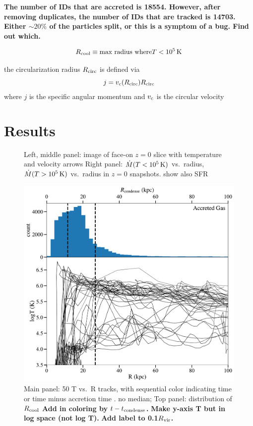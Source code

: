 \documentclass[fleqn,usenatbib]{mnras}
\newcommand{\Rcool}{R_{\rm cool}} %
\newcommand{\Mdot}{\dot{M}}
\newcommand{\Rcirc}{R_{\rm circ}} %
\begin{document}
\textbf{The number of IDs that are accreted is 18554.
However, after removing duplicates, the number of IDs that are tracked is 14703.
Either $\sim20\%$ of the particles split, or this is a symptom of a bug.
Find out which.}


\begin{equation}
    \Rcool \equiv \text{max radius where} T<10^5\,{\rm K}
\end{equation}


the circularization radius $\Rcirc$ is defined via
\begin{equation}
    j = v_{\rm c}(\Rcirc)\Rcirc
\end{equation}
where $j$ is the specific angular momentum and $v_{\rm c}$ is the circular velocity



\section{Results}


\begin{figure}
    \centering
    \caption{
    Left, middle panel: image of face-on $z=0$ slice with temperature and velocity arrows
    Right panel: $\Mdot(T<10^{5}\,{\rm K})$ vs.\ radius, $\Mdot(T>10^{5}\,{\rm K})$ vs.\ radius in $z=0$ snapshots. show also SFR}
    \label{f:Mdot}
\end{figure}


\begin{figure}
    \centering
    \includegraphics[width=\columnwidth]{figures/rcondense_and_tracks.pdf}
    \caption{
    Main panel: 50 T vs.\ R tracks, with sequential color indicating time or time minus accretion time . no median;
    Top panel: distribution of $\Rcool$
    \textbf{Add in coloring by $t - t_{\rm{condense}}$.}
    \textbf{Make y-axis T but in log space (not log T).}
    \textbf{Add label to 0.1$R_{\rm vir}$.}
    }
    \label{f: T vs R}
\end{figure}
\end{document}
